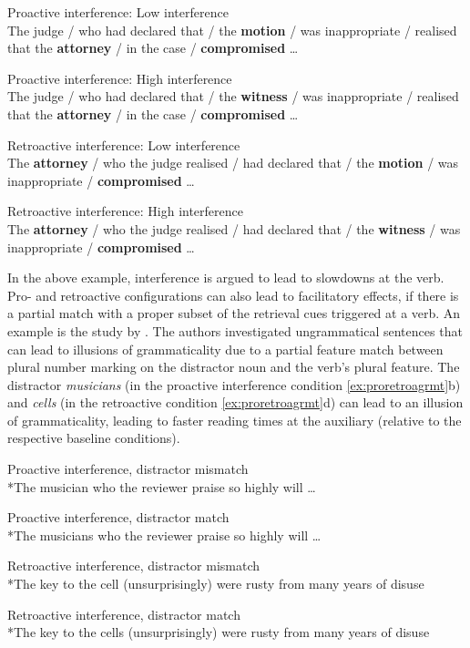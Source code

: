 \documentclass{cambridge7A}\usepackage[]{graphicx}\usepackage[]{color}
\begin{document}
\begin{exe}
\ex \label{ex:proretrovandyke2011}
\begin{xlist}
\item Proactive interference: Low interference\\
The judge / who had declared that / the \textbf{motion} / was inappropriate / realised that the \textbf{attorney} / in the case / \textbf{compromised} \dots
\item Proactive interference: High interference\\
The judge / who had declared that / the \textbf{witness} / was inappropriate / realised that the \textbf{attorney} / in the case / \textbf{compromised} \dots
\item Retroactive interference: Low interference \\
The \textbf{attorney} / who the judge realised / had declared that / the \textbf{motion} / was inappropriate / \textbf{compromised} \dots
\item Retroactive interference: High interference \\
The \textbf{attorney} / who the judge realised / had declared that / the \textbf{witness} / was inappropriate / \textbf{compromised} \dots
\end{xlist}
\end{exe}

In the above example, interference is argued to lead to slowdowns at the verb.
Pro- and retroactive configurations can also lead to facilitatory effects, if there is a partial match with a proper subset of the retrieval cues triggered at a verb.  An example is the study by \cite{WagersLauPhillips2009}. The authors investigated ungrammatical sentences that can lead to illusions of grammaticality due to a partial feature match  between plural number marking on the distractor noun and the verb's plural feature.
The distractor \textit{musicians} (in the proactive interference condition \ref{ex:proretroagrmt}b) and \textit{cells} (in the retroactive condition \ref{ex:proretroagrmt}d) can lead to an illusion of grammaticality, leading to faster reading times at the auxiliary (relative to the respective baseline conditions).

\begin{exe}
\ex \label{ex:proretroagrmt}
\begin{xlist}
\item Proactive interference, distractor mismatch\\
*The musician who the reviewer praise so highly will \dots
\item Proactive interference, distractor match\\
*The musicians who the reviewer praise so highly will \dots
\item Retroactive interference, distractor mismatch\\
*The key to the cell (unsurprisingly) were rusty from many years of disuse 
\item Retroactive interference, distractor match\\
*The key to the cells (unsurprisingly) were rusty from many years of disuse
\end{xlist}
\end{exe}
\end{document}
